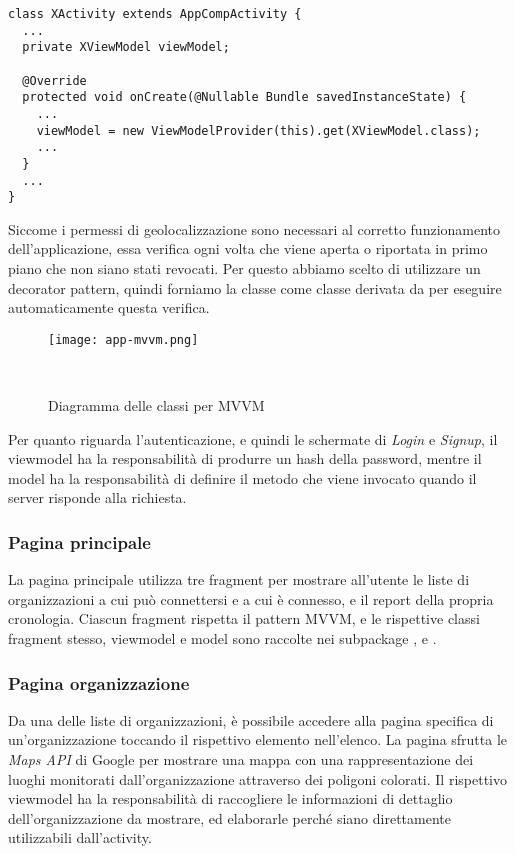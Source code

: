 \documentclass[../../manuale-manutentore.tex]{subfiles}
\begin{document}
\begin{verbatim}
class XActivity extends AppCompActivity {
  ...
  private XViewModel viewModel;

  @Override
  protected void onCreate(@Nullable Bundle savedInstanceState) {
    ...
    viewModel = new ViewModelProvider(this).get(XViewModel.class);
    ...
  }
  ...
}
\end{verbatim}

Siccome i permessi di geolocalizzazione sono necessari al corretto funzionamento dell'applicazione, essa verifica ogni volta che viene aperta o riportata in primo piano che non siano stati revocati.
Per questo abbiamo scelto di utilizzare un decorator pattern, quindi forniamo la classe  come classe derivata da  per eseguire automaticamente questa verifica.

\begin{figure}[ht]
  \centering
  \texttt{[image: app-mvvm.png]}
  \caption{Diagramma delle classi per MVVM}
~~\label{fig:app/diagramma_classi_mvvm}
\end{figure}

Per quanto riguarda l'autenticazione, e quindi le schermate di \textit{Login} e \textit{Signup}, il viewmodel ha la responsabilità di produrre un hash della password, mentre il model ha la responsabilità di definire il metodo  che viene invocato quando il server risponde alla richiesta.

\subsubsection{Pagina principale}%
\label{subs:pagina_principale}

La pagina principale utilizza tre fragment per mostrare all'utente le liste di organizzazioni a cui può connettersi e a cui è connesso, e il report della propria cronologia.
Ciascun fragment rispetta il pattern MVVM, e le rispettive classi fragment stesso, viewmodel e model sono raccolte nei subpackage ,  e .


\subsubsection{Pagina organizzazione}%
\label{subs:pagina_organizzazione}
Da una delle liste di organizzazioni, è possibile accedere alla pagina specifica di un'organizzazione toccando il rispettivo elemento nell'elenco.
La pagina sfrutta le \textit{Maps API} di Google per mostrare una mappa con una rappresentazione dei luoghi monitorati dall'organizzazione attraverso dei poligoni colorati.
Il rispettivo viewmodel ha la responsabilità di raccogliere le informazioni di dettaglio dell'organizzazione da mostrare, ed elaborarle perché siano direttamente utilizzabili dall'activity.
\end{document}
